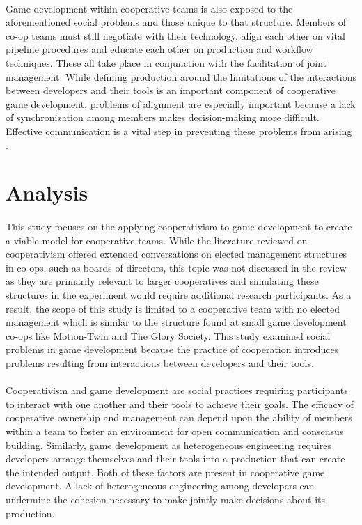 \paragraph{} Game development within cooperative teams is also exposed to the aforementioned social problems and those unique to that structure.  Members of co-op teams must still negotiate with their technology, align each other on vital pipeline procedures and educate each other on production and workflow techniques. These all take place in conjunction with the facilitation of joint management. While defining production around the limitations of the interactions between developers and their tools is an important component of cooperative game development, problems of alignment are especially important because a lack of synchronization among members makes decision-making more difficult. Effective communication is a vital step in preventing these problems from arising \autocite{game_developers_conference_embracing_2019}.

\section{Analysis}

\paragraph{} This study focuses on the applying cooperativism to game development to create a viable model for cooperative teams. While the literature reviewed on cooperativism offered extended conversations on elected management structures in co-ops, such as boards of directors, this topic was not discussed in the review as they are primarily relevant to larger cooperatives and simulating these structures in the experiment would require additional research participants. As a result, the scope of this study is limited to a cooperative team with no elected management which is similar to the structure found at small game development co-ops like Motion-Twin and The Glory Society. This study examined social problems in game development because the practice of cooperation introduces problems resulting from interactions between developers and their tools.  

\paragraph{} Cooperativism and game development are social practices requiring participants to interact with one another and their tools to achieve their goals. The efficacy of cooperative ownership and management can depend upon the ability of members within a team to foster an environment for open communication and consensus building. Similarly, game development as heterogeneous engineering requires developers arrange themselves and their tools into a production that can create the intended output. Both of these factors are present in cooperative game development. A lack of heterogeneous engineering among developers can undermine the cohesion necessary to make jointly make decisions about its production.  

